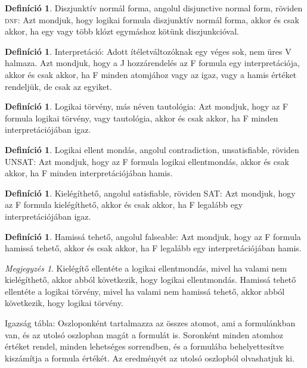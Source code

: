 \documentclass[
]{thesis-ekf}
\theoremstyle{definition}
\newtheorem{definicio}[tetel]{Definíció}
\theoremstyle{remark}
\newtheorem{megjegyzes}[tetel]{Megjegyzés}
\begin{document}
	\begin{definicio}\label{dnf}
		Diszjunktív normál forma, angolul disjunctive normal form, röviden \textsc{dnf}: Azt mondjuk, hogy logikai formula diszjunktív normál forma, akkor és csak akkor, ha egy vagy több klózt egymáshoz kötünk diszjunkcióval.
	\end{definicio}

	\begin{definicio}
		Interpretáció: Adott ítéletváltozóknak egy véges sok, nem üres V halmaza.
		Azt mondjuk, hogy a J hozzárendelés az F formula egy interpretációja, akkor és csak akkor, ha F minden atomjához vagy az igaz, vagy a hamis értéket rendeljük, de csak az egyiket.
	\end{definicio}

	\begin{definicio}\label{tautologia}
		Logikai törvény, más néven tautológia: Azt mondjuk, hogy az F formula logikai törvény, vagy tautológia, akkor és csak akkor, ha F minden interpretációjában igaz.
	\end{definicio}

	\begin{definicio}
		Logikai ellent mondás, angolul contradiction, unsatisfiable, röviden UNSAT: Azt mondjuk, hogy az F formula logikai ellentmondás, akkor és csak akkor, ha F minden interpretációjában hamis.
	\end{definicio}

	\begin{definicio}
		Kielégíthető, angolul satisfiable, röviden SAT: Azt mondjuk, hogy az F formula kielégíthető, akkor és csak akkor, ha F legalább egy interpretációjában igaz.
	\end{definicio}

	\begin{definicio}
		Hamissá tehető, angolul falseable: Azt mondjuk, hogy az F formula hamissá tehető, akkor és csak akkor, ha F legalább egy interpretációjában hamis. 
	\end{definicio}

	\begin{megjegyzes}
		Kielégítő ellentéte a logikai ellentmondás, mivel ha valami nem kielégíthető, akkor abból következik, hogy logikai ellentmondás.
		Hamissá tehető ellentéte a logikai törvény, mivel ha valami nem hamissá tehető, akkor abból következik, hogy logikai törvény.
	\end{megjegyzes}

	Igazság tábla: Oszloponként tartalmazza az összes atomot, ami a formulánkban van, és az utolsó oszlopban magát a formulát is. Soronként minden atomhoz értéket rendel, minden lehetséges sorrendben, és a formulába behelyettesítve kiszámítja a formula értékét. Az eredményét az utolsó oszlopból olvashatjuk ki.
	
\end{document}
